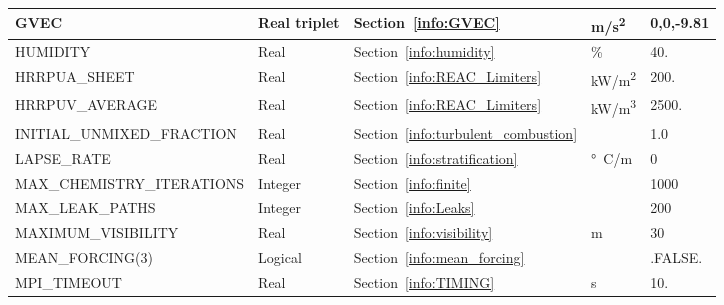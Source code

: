 \documentclass[11pt]{book}
\begin{document}
\begin{longtable}{@{\extracolsep{\fill}}|l|l|l|l|l|}
{\ct GVEC}                                      & Real triplet  & Section~\ref{info:GVEC}                               & \si{m/s^2}    & 0,0,-9.81         \\ \hline
{\ct HUMIDITY}                                  & Real          & Section~\ref{info:humidity}                           & \%            & 40.               \\ \hline
{\ct HRRPUA\_SHEET}                             & Real          & Section~\ref{info:REAC_Limiters}                      & \si{kW/m^2}   & 200.              \\ \hline
{\ct HRRPUV\_AVERAGE}                           & Real          & Section~\ref{info:REAC_Limiters}                      & \si{kW/m^3}   & 2500.             \\ \hline
{\ct INITIAL\_UNMIXED\_FRACTION}                & Real          & Section~\ref{info:turbulent_combustion}               &               & 1.0               \\ \hline
{\ct LAPSE\_RATE}                               & Real          & Section~\ref{info:stratification}                     & \si{\degree C/m} & 0              \\ \hline
{\ct MAX\_CHEMISTRY\_ITERATIONS}                & Integer       & Section~\ref{info:finite}                             &               &  1000             \\ \hline
{\ct MAX\_LEAK\_PATHS}                          & Integer       & Section~\ref{info:Leaks}                             &               &  200              \\ \hline
{\ct MAXIMUM\_VISIBILITY}                       & Real          & Section~\ref{info:visibility}                         &  m            &  30               \\ \hline
{\ct MEAN\_FORCING(3)}                          & Logical       & Section~\ref{info:mean_forcing}                       &               & {\ct .FALSE.}     \\ \hline
{\ct MPI\_TIMEOUT}                              & Real          & Section~\ref{info:TIMING}                             &  s            & 10.               \\ \hline

\end{longtable}
\end{document}
